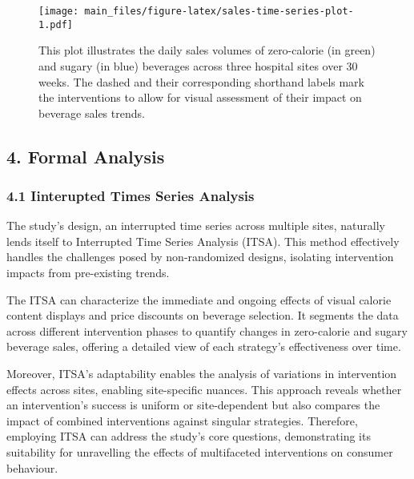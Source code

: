 \documentclass[
]{article}
\newenvironment{Shaded}{\begin{snugshade}}{\end{snugshade}}
\newcommand{\CommentTok}[1]{\textcolor[rgb]{0.56,0.35,0.01}{\textit{#1}}}
\begin{document}
\begin{figure}
\centering
\texttt{[image: main\_files/figure-latex/sales-time-series-plot-1.pdf]}
\caption{This plot illustrates the daily sales volumes of zero-calorie
(in green) and sugary (in blue) beverages across three hospital sites
over 30 weeks. The dashed and their corresponding shorthand labels mark
the interventions to allow for visual assessment of their impact on
beverage sales trends.}
\end{figure}

\hypertarget{formal-analysis}{%
\subsection{4. Formal Analysis}\label{formal-analysis}}

\begin{Shaded}
\end{Shaded}

\hypertarget{iinterupted-times-series-analysis}{%
\subsubsection{4.1 Iinterupted Times Series
Analysis}\label{iinterupted-times-series-analysis}}

The study's design, an interrupted time series across multiple sites,
naturally lends itself to Interrupted Time Series Analysis (ITSA). This
method effectively handles the challenges posed by non-randomized
designs, isolating intervention impacts from pre-existing trends.

The ITSA can characterize the immediate and ongoing effects of visual
calorie content displays and price discounts on beverage selection. It
segments the data across different intervention phases to quantify
changes in zero-calorie and sugary beverage sales, offering a detailed
view of each strategy's effectiveness over time.

Moreover, ITSA's adaptability enables the analysis of variations in
intervention effects across sites, enabling site-specific nuances. This
approach reveals whether an intervention's success is uniform or
site-dependent but also compares the impact of combined interventions
against singular strategies. Therefore, employing ITSA can address the
study's core questions, demonstrating its suitability for unravelling
the effects of multifaceted interventions on consumer behaviour.
\end{document}
